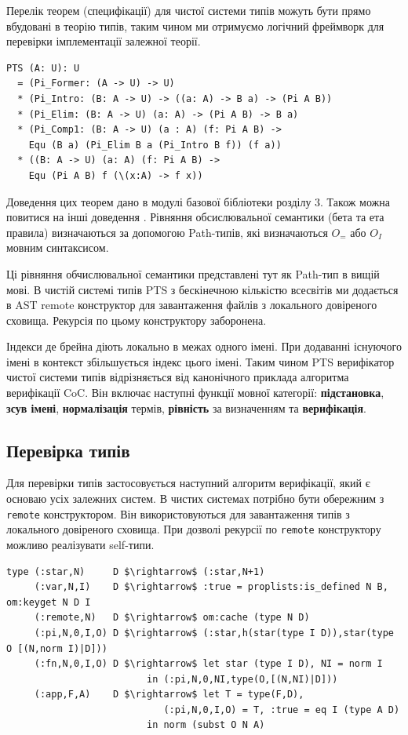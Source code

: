 Перелік теорем (специфікації) для чистої системи типів можуть бути
прямо вбудовані в теорію типів, таким чином ми отримуємо логічний фреймворк
для перевірки імплементації залежної теорії.

\begin{lstlisting}[mathescape=true]
PTS (A: U): U
  = (Pi_Former: (A -> U) -> U)
  * (Pi_Intro: (B: A -> U) -> ((a: A) -> B a) -> (Pi A B))
  * (Pi_Elim: (B: A -> U) (a: A) -> (Pi A B) -> B a)
  * (Pi_Comp1: (B: A -> U) (a : A) (f: Pi A B) ->
    Equ (B a) (Pi_Elim B a (Pi_Intro B f)) (f a))
  * ((B: A -> U) (a: A) (f: Pi A B) ->
    Equ (Pi A B) f (\(x:A) -> f x))
\end{lstlisting}

Доведення цих теорем дано в модулі базової бібліотеки розділу 3.
Також можна повитися на інші доведення \cite{Henk93}.
Рівняння обсислювальної семантики (бета та ета правила) визначаються
за допомогою Path-типів, які визначаються $O_=$ або $O_I$ мовним синтаксисом.

Ці рівняння обчислювальної семантики представлені тут як Path-тип в вищій мові.
В чистій системі типів PTS з бескінечною кількістю всесвітів ми додається в AST
remote конструктор для завантаження файлів з локального довіреного сховища.
Рекурсія по цьому конструктору заборонена.

Індекси де брейна діють локально в межах одного імені.
При додаванні існуючого імені в контекст збільшується індекс цього імені.
Таким чином PTS верифікатор чистої системи типів відрізняється від
канонічного приклада алгоритма верифікації CoC\cite{Coq88}. Він включає
наступні функції мовної категорії: {\bf підстановка},
{\bf зсув імені}, {\bf нормалізація} термів, {\bf рівність}
за визначенням та {\bf верифікація}.

\subsection{Перевірка типів}

Для перевірки типів застосовується наступний алгоритм верифікації, який є основаю
усіх залежних систем. В чистих системах потрібно бути обережним з \lstinline{remote}
конструктором. Він використовуються для завантаження типів з локального довіреного сховища.
При дозволі рекурсії по \lstinline{remote} конструктору можливо реалізувати
self-типи\cite{Stump17}\cite{Fu14}.

\begin{lstlisting}[mathescape=true]
type (:star,N)     D $\rightarrow$ (:star,N+1)
     (:var,N,I)    D $\rightarrow$ :true = proplists:is_defined N B, om:keyget N D I
     (:remote,N)   D $\rightarrow$ om:cache (type N D)
     (:pi,N,0,I,O) D $\rightarrow$ (:star,h(star(type I D)),star(type O [(N,norm I)|D]))
     (:fn,N,0,I,O) D $\rightarrow$ let star (type I D), NI = norm I
                         in (:pi,N,0,NI,type(O,[(N,NI)|D]))
     (:app,F,A)    D $\rightarrow$ let T = type(F,D),
                            (:pi,N,0,I,O) = T, :true = eq I (type A D)
                         in norm (subst O N A)
\end{lstlisting}

